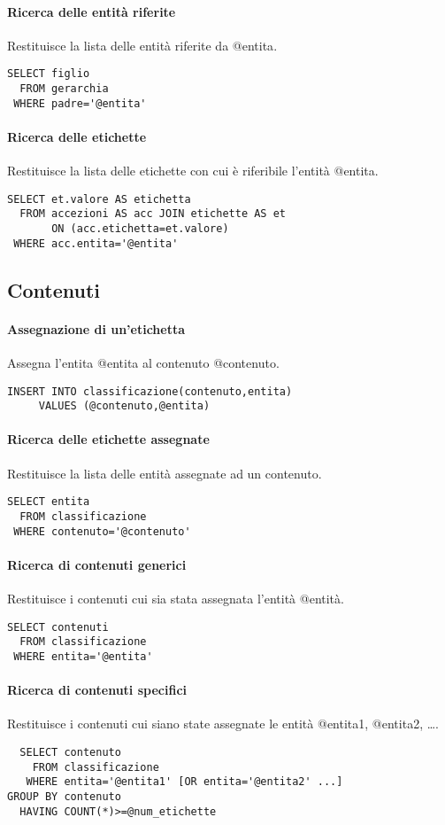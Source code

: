 \paragraph{Ricerca delle entità riferite}
Restituisce la lista delle entità riferite da \textsf{@entita}.
\begin{verbatim}
SELECT figlio
  FROM gerarchia
 WHERE padre='@entita'
\end{verbatim}

\paragraph{Ricerca delle etichette}
Restituisce la lista delle etichette con cui è riferibile l'entità \textsf{@entita}.
\begin{verbatim}
SELECT et.valore AS etichetta
  FROM accezioni AS acc JOIN etichette AS et
       ON (acc.etichetta=et.valore)
 WHERE acc.entita='@entita'
\end{verbatim}

\subsection*{Contenuti}
\paragraph{Assegnazione di un'etichetta}
Assegna l'entita \textsf{@entita} al contenuto \textsf{@contenuto}.
\begin{verbatim}
INSERT INTO classificazione(contenuto,entita)
     VALUES (@contenuto,@entita)
\end{verbatim}

\paragraph{Ricerca delle etichette assegnate}
Restituisce la lista delle entità assegnate ad un contenuto.
\begin{verbatim}
SELECT entita
  FROM classificazione
 WHERE contenuto='@contenuto'
\end{verbatim}

\paragraph{Ricerca di contenuti generici}
Restituisce i contenuti cui sia stata assegnata l'entità \textsf{@entità}.
\begin{verbatim}
SELECT contenuti
  FROM classificazione
 WHERE entita='@entita'
\end{verbatim}

\paragraph{Ricerca di contenuti specifici}
Restituisce i contenuti cui siano state assegnate le entità \textsf{@entita1}, \textsf{@entita2}, \ldots .
\begin{verbatim}
  SELECT contenuto
    FROM classificazione
   WHERE entita='@entita1' [OR entita='@entita2' ...]
GROUP BY contenuto
  HAVING COUNT(*)>=@num_etichette
\end{verbatim}
